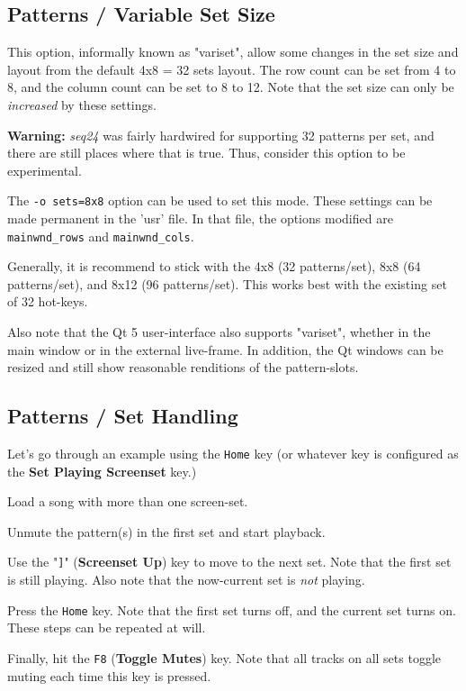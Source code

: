 \subsection{Patterns / Variable Set Size}
\label{subsec:patterns_panel_variset}

   This option, informally known as "variset", allow some changes in
   the set size and layout from the default 4x8 = 32 sets layout.
   The row count can be set from 4 to 8, and the column count can be set to 8
   to 12.  Note that the set size can only be \textsl{increased} by these
   settings.

   \textbf{Warning:}
   \textsl{seq24} was fairly hardwired for supporting 32 patterns per
   set, and there are still places where that is true.  Thus,
   consider this option to be experimental.

   The \texttt{-o sets=8x8} option can be used to set this mode.
   These settings can be made permanent in the 'usr' file.
   In that file, the options modified are \texttt{mainwnd\_rows} and
   \texttt{mainwnd\_cols}.

   Generally, it is recommend to stick with the 4x8 (32 patterns/set),
   8x8 (64 patterns/set), and 8x12 (96 patterns/set).  This works best with the
   existing set of 32 hot-keys.

   Also note that the Qt 5 user-interface also supports "variset", whether in
   the main window or in the external live-frame.  In addition, the Qt windows
   can be resized and still show reasonable renditions of the pattern-slots.

\subsection{Patterns / Set Handling}
\label{subsec:patterns_panel_set_handling}

   Let's go through an example using the \texttt{Home} key (or whatever key is
   configured as the \textbf{Set Playing Screenset} key.)

   \begin{enumber}
      \item Load a song with more than one screen-set.
      \item Unmute the pattern(s) in the first set and start playback.
      \item Use the "\texttt{]}" (\textbf{Screenset Up}) key to move to the next
         set.  Note that the first set is still playing.  Also note that the
         now-current set is \textsl{not} playing.
      \item Press the \texttt{Home} key.
         Note that the first set turns off, and the current set turns on.
         These steps can be repeated at will.
      \item Finally, hit the \texttt{F8} (\textbf{Toggle Mutes}) key.
         Note that all tracks on all sets toggle muting each time this key is
         pressed.
   \end{enumber}

